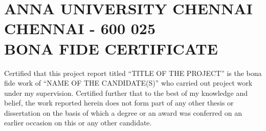 \documentclass[13 pt,a4paper]{aureportm}
\begin{document}
\chapter*{ANNA UNIVERSITY CHENNAI\\
CHENNAI - 600 025\\
BONA FIDE CERTIFICATE}
\newlength{\aulength}
\settowidth{\aulength}{Anna University
  Chennai}
\newlength{\datewidth}
\settowidth{\datewidth}{Chennai 600 025}

\begin{spacing}{1.5}
  \begin{sloppypar}
  \fontsize{14}{17}\selectfont Certified that this project report titled ``TITLE OF THE PROJECT'' is the bona fide work of ``NAME OF THE CANDIDATE(S)'' who carried out project work under my supervision. Certified further that to the best of my knowledge and belief, the work reported herein does not form part of any other thesis or dissertation on the basis of which a degree or an award was conferred on an earlier occasion on this or any other candidate.
  \end{sloppypar}
\end{spacing}

\end{document}
